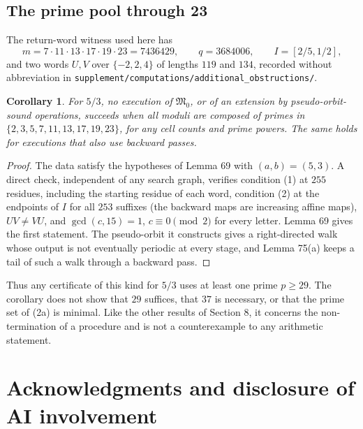 \documentclass[11pt,reqno]{amsart}
\newtheorem{corollary}[theorem]{Corollary}
\theoremstyle{definition}
\theoremstyle{remark}
\begin{document}
\subsection{The prime pool through 23}\label{sec:F.5}

The return-word witness used here has
\[
m=7\cdot11\cdot13\cdot17\cdot19\cdot23=7436429,\qquad q=3684006,
\qquad I=[2/5,1/2],
\]
and two words \(U,V\) over \(\{-2,2,4\}\) of lengths \(119\) and
\(134\), recorded without abbreviation in
\nolinkurl{supplement/computations/additional_obstructions/}.

\begin{samepage}
\begin{corollary}\leavevmode\label{thm:78}
For \(5/3\), no execution of \(\mathfrak M_0\), or of an extension by
pseudo-orbit-sound operations, succeeds when all moduli are composed of
primes in \(\{2,3,5,7,11,13,17,19,23\}\), for any cell counts and prime
powers. The same holds for executions that also use backward passes.
\label{thm-end:78}
\end{corollary}
\end{samepage}

\begin{proof}\leavevmode\label{proof:78}
The data satisfy the hypotheses of Lemma 69 with
\((a,b)=(5,3)\). A direct check, independent of any search graph,
verifies condition (1) at \(255\) residues, including the starting
residue of each word, condition (2) at the endpoints of \(I\) for all \(253\) suffixes
(the backward maps are increasing affine maps), \(UV\ne VU\), and
\(\gcd(c,15)=1\), \(c\equiv0\pmod2\) for every letter. Lemma 69 gives the
first statement. The pseudo-orbit it constructs gives a right-directed
walk whose output is not eventually periodic at every stage, and
Lemma 75(a) keeps a tail of such a walk through a backward pass. \qedhere
\end{proof}

Thus any certificate of this kind for \(5/3\) uses at least one prime
\(p\ge29\). The corollary does not show that \(29\) suffices, that
\(37\) is necessary, or that the prime set of (2a) is minimal. Like the
other results of Section 8, it concerns the non-termination of a
procedure and is not a counterexample to any arithmetic statement.

\section*{Acknowledgments and disclosure of AI involvement}
\end{document}
